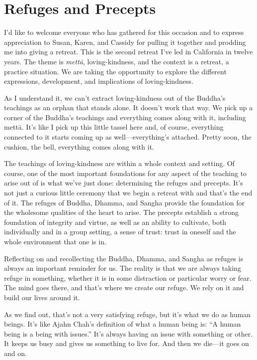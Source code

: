 \chapter{Refuges and Precepts}

I’d like to welcome everyone who has gathered for this occasion and to
express appreciation to Susan, Karen, and Cassidy for pulling it
together and prodding me into giving a retreat. This is the second
retreat I’ve led in California in twelve years. The theme is
\emph{mettā}, loving-kindness, and the context is a retreat, a practice
situation. We are taking the opportunity to explore the different
expressions, development, and implications of loving-kindness.

As I understand it, we can’t extract loving-kindness out of the Buddha’s
teachings as an orphan that stands alone. It doesn’t work that way. We
pick up a corner of the Buddha’s teachings and everything comes along
with it, including mettā. It’s like I pick up this little tassel here
and, of course, everything connected to it starts coming up as
well—everything’s attached. Pretty soon, the cushion, the bell,
everything comes along with it.

The teachings of loving-kindness are within a whole context and setting.
Of course, one of the most important foundations for any aspect of the
teaching to arise out of is what we’ve just done: determining the
refuges and precepts. It’s not just a curious little ceremony that we
begin a retreat with and that’s the end of it. The refuges of Buddha,
Dhamma, and Sangha provide the foundation for the wholesome qualities of
the heart to arise. The precepts establish a strong foundation of
integrity and virtue, as well as an ability to cultivate, both
individually and in a group setting, a sense of trust: trust in oneself
and the whole environment that one is in.

Reflecting on and recollecting the Buddha, Dhamma, and Sangha as refuges
is always an important reminder for us. The reality is that we are
always taking refuge in something, whether it is in some distraction or
particular worry or fear. The mind goes there, and that’s where we
create our refuge. We rely on it and build our lives around it.

As we find out, that’s not a very satisfying refuge, but it’s what we do
as human beings. It’s like Ajahn Chah’s definition of what a human being
is: “A human being is a being with issues.” It’s always having an issue
with something or other. It keeps us busy and gives us something to live
for. And then we die—it goes on and on.

